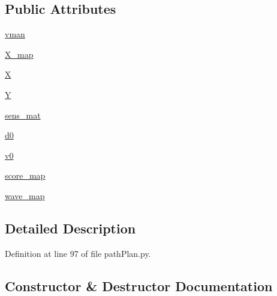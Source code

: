 \subsection*{Public Attributes}
\begin{DoxyCompactItemize}
\item 
\mbox{\hyperlink{classpath_plan_1_1_path_planner_a8e31f83f0d8983286bb3746da568af81}{vman}}
\item 
\mbox{\hyperlink{classpath_plan_1_1_path_planner_a726f4b4f55f7fb557eabceb962e25871}{X\+\_\+map}}
\item 
\mbox{\hyperlink{classpath_plan_1_1_path_planner_ac7e6ed6310bc8e1064e42af17b8a5948}{X}}
\item 
\mbox{\hyperlink{classpath_plan_1_1_path_planner_a4e78ffd0fb9df91a15d01ca5cb615d24}{Y}}
\item 
\mbox{\hyperlink{classpath_plan_1_1_path_planner_a3a23d66cb64460f9c5ae8968071323c2}{sens\+\_\+mat}}
\item 
\mbox{\hyperlink{classpath_plan_1_1_path_planner_a508cce57c5e6deb7880fe2ef631c983e}{d0}}
\item 
\mbox{\hyperlink{classpath_plan_1_1_path_planner_a56e0e1649ae12d5c72409041c2aaeae9}{v0}}
\item 
\mbox{\hyperlink{classpath_plan_1_1_path_planner_aec7491cbbb5ea16f5fbeceecbb405efd}{score\+\_\+map}}
\item 
\mbox{\hyperlink{classpath_plan_1_1_path_planner_a3db343c9859cd328507cee118e1df6b3}{wave\+\_\+map}}
\end{DoxyCompactItemize}


\subsection{Detailed Description}


Definition at line 97 of file path\+Plan.\+py.



\subsection{Constructor \& Destructor Documentation}
\mbox{\label{classpath_plan_1_1_path_planner_a4725d91c2d54372bbfecfce0a71a3552}} 
